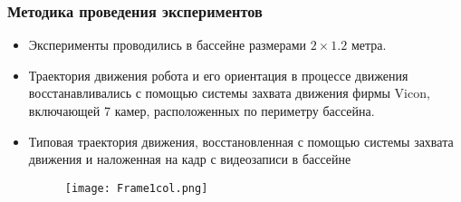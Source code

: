 %
%



\begin{frame}
\frametitle{Методика проведения экспериментов}

	\begin{itemize}
		\item Эксперименты проводились в бассейне размерами $2 \times 1.2$ метра. 
		\item Траектория движения робота и его ориентация в процессе движения восстанавливались с помощью системы захвата движения фирмы Vicon, включающей 7 камер, расположенных по периметру бассейна. 
		\item Типовая траектория движения, восстановленная с помощью системы захвата движения и наложенная на кадр с видеозаписи в бассейне
		
		\begin{figure}[!h]
			\centering
			\texttt{[image: Frame1col.png]}
		\end{figure}
	\end{itemize}



\end{frame}



